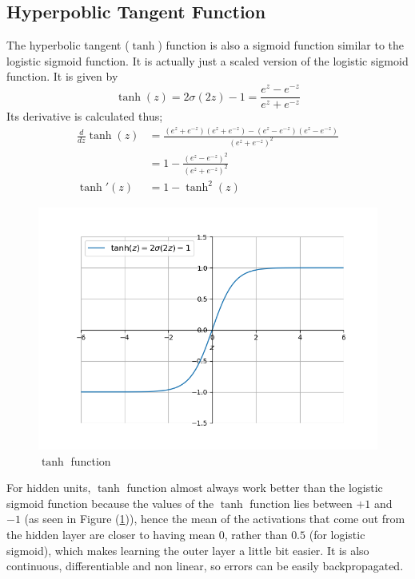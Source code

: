 \documentclass[12pt]{report}
\numberwithin{equation}{section}
\begin{document}
\subsection{Hyperpoblic Tangent Function}
The hyperbolic tangent ($\tanh$) function is also a sigmoid function similar to the logistic sigmoid function. It is actually just a scaled version of the logistic sigmoid function. It is given by 
\begin{equation}\label{eqn:tanh}
\tanh(z) = 2\sigma(2z) - 1 = \frac{e^z - e^{-z}}{e^z + e^{-z}}
\end{equation}
Its derivative is calculated thus;
\begin{equation}\label{eqn:tanh_prime}
\begin{split}
\frac{d}{dz}\tanh(z) &= \frac{(e^z + e^{-z})(e^z + e^{-z})-(e^z - e^{-z})(e^z - e^{-z})}{(e^z + e^{-z})^2} \\
	&= 1 - \frac{(e^z - e^{-z})^2}{(e^z + e^{-z})^2} \\
\tanh'(z)	&= 1 - \tanh^2(z)
\end{split}
\end{equation}
\begin{figure}[htb!]
\centering 
\includegraphics[scale=0.9]{png/tanh.png} 
\caption{$\tanh$ function}
\label{fig:tanh}
\end{figure}
For hidden units, $\tanh$ function almost always work better than the logistic sigmoid function because the values of the $\tanh$ function lies between $+1$ and $-1$ (as seen in Figure (\ref{fig:tanh})), hence the mean of the activations that come out from the hidden layer are closer to having mean $0$, rather than $0.5$ (for logistic sigmoid), which makes learning the outer layer a little bit easier. It is also continuous, differentiable and non linear, so errors can be easily backpropagated.
\end{document}
